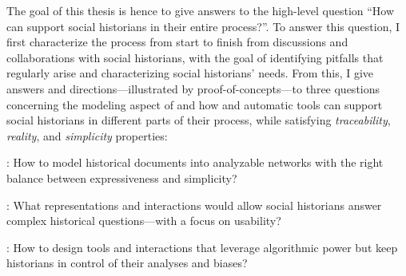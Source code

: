 The goal of this thesis is hence to give answers to the high-level question ``How can \va support social historians in their entire \hsna process?''.
To answer this question, I first characterize the \hsna process from start to finish from discussions and collaborations with social historians, with the goal of identifying pitfalls that regularly arise and characterizing social historians' needs.
From this, I give answers and directions---illustrated by proof-of-concepts---to three questions concerning the modeling aspect of \hsna and how \va and automatic tools can support social historians in different parts of their process, while satisfying \emph{traceability}, \emph{reality}, and \emph{simplicity} properties:


\begin{description}
    \item \qone:  How to model historical documents into analyzable networks with the right balance between expressiveness and simplicity?
    \item \qtwo:  What representations and interactions would allow social historians answer complex historical questions---with a focus on usability?
    \item \qthree: How to design \va tools and interactions that leverage algorithmic power but keep historians in control of their analyses and biases?
\end{description}

